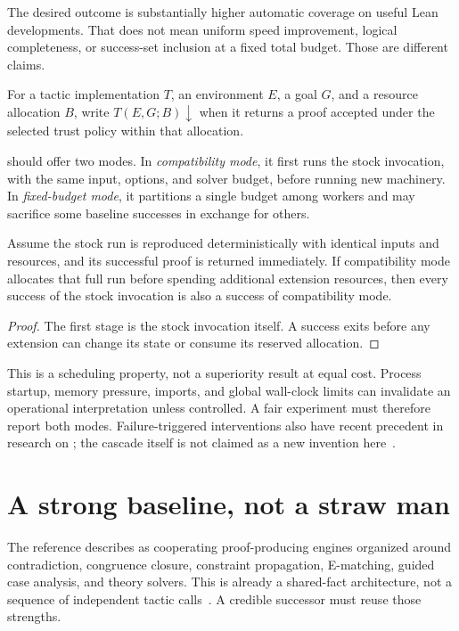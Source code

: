 The desired outcome is substantially higher automatic coverage on useful Lean developments. That does not mean uniform speed improvement, logical completeness, or success-set inclusion at a fixed total budget. Those are different claims.

\begin{definition}
For a tactic implementation $T$, an environment $E$, a goal $G$, and a resource allocation $B$, write $T(E,G;B)\downarrow$ when it returns a proof accepted under the selected trust policy within that allocation.
\end{definition}

\forge{} should offer two modes. In \emph{compatibility mode}, it first runs the stock \grind{} invocation, with the same input, options, and solver budget, before running new machinery. In \emph{fixed-budget mode}, it partitions a single budget among workers and may sacrifice some baseline successes in exchange for others.

\begin{proposition}
Assume the stock run is reproduced deterministically with identical inputs and resources, and its successful proof is returned immediately. If compatibility mode allocates that full run before spending additional extension resources, then every success of the stock invocation is also a success of compatibility mode.
\end{proposition}
\begin{proof}
The first stage is the stock invocation itself. A success exits before any extension can change its state or consume its reserved allocation.
\end{proof}

This is a scheduling property, not a superiority result at equal cost. Process startup, memory pressure, imports, and global wall-clock limits can invalidate an operational interpretation unless controlled. A fair experiment must therefore report both modes. Failure-triggered interventions also have recent precedent in research on \grind{}; the cascade itself is not claimed as a new invention here~\cite{learned}.

\section{A strong baseline, not a straw man}

The reference describes \grind{} as cooperating proof-producing engines organized around contradiction, congruence closure, constraint propagation, E-matching, guided case analysis, and theory solvers. This is already a shared-fact architecture, not a sequence of independent tactic calls~\cite{grindref}. A credible successor must reuse those strengths.

